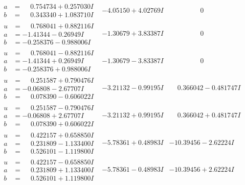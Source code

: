 \documentclass[1p]{elsarticle_modified}
\theoremstyle{definition}
\begin{document}
$$\begin{array}{c|c|c}
\begin{aligned}
a &= \phantom{-}0.754734 + 0.257030 I \\
b &= \phantom{-}0.343340 + 1.083710 I\end{aligned}
 & -4.05150 + 4.02769 I & \phantom{-0.000000 } 0 \\ \hline\begin{aligned}
u &= \phantom{-}0.768041 + 0.882116 I \\
a &= -1.41344 - 0.26949 I \\
b &= -0.258376 - 0.988006 I\end{aligned}
 & -1.30679 + 3.83387 I & \phantom{-0.000000 } 0 \\ \hline\begin{aligned}
u &= \phantom{-}0.768041 - 0.882116 I \\
a &= -1.41344 + 0.26949 I \\
b &= -0.258376 + 0.988006 I\end{aligned}
 & -1.30679 - 3.83387 I & \phantom{-0.000000 } 0 \\ \hline\begin{aligned}
u &= \phantom{-}0.251587 + 0.790476 I \\
a &= -0.06808 - 2.67707 I \\
b &= \phantom{-}0.078390 - 0.606022 I\end{aligned}
 & -3.21132 - 0.99195 I & \phantom{-}0.366042 - 0.481747 I \\ \hline\begin{aligned}
u &= \phantom{-}0.251587 - 0.790476 I \\
a &= -0.06808 + 2.67707 I \\
b &= \phantom{-}0.078390 + 0.606022 I\end{aligned}
 & -3.21132 + 0.99195 I & \phantom{-}0.366042 + 0.481747 I \\ \hline\begin{aligned}
u &= \phantom{-}0.422157 + 0.658850 I \\
a &= \phantom{-}0.231809 - 1.133400 I \\
b &= \phantom{-}0.526101 - 1.119800 I\end{aligned}
 & -5.78361 + 0.48983 I & -10.39456 - 2.62224 I \\ \hline\begin{aligned}
u &= \phantom{-}0.422157 - 0.658850 I \\
a &= \phantom{-}0.231809 + 1.133400 I \\
b &= \phantom{-}0.526101 + 1.119800 I\end{aligned}
 & -5.78361 - 0.48983 I & -10.39456 + 2.62224 I \\ \hline\begin{aligned}

\end{aligned}
\end{array}$$
\end{document}
